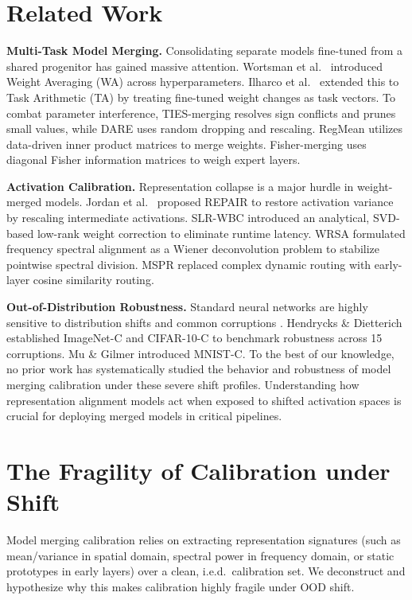 \documentclass{article}
\theoremstyle{plain}
\theoremstyle{definition}
\theoremstyle{remark}
\begin{document}
\section{Related Work}
\label{sec:related}
\textbf{Multi-Task Model Merging.} Consolidating separate models fine-tuned from a shared progenitor has gained massive attention. Wortsman et al.\ \cite{wortsman2022model} introduced Weight Averaging (WA) across hyperparameters. Ilharco et al.\ \cite{ilharco2022editing} extended this to Task Arithmetic (TA) by treating fine-tuned weight changes as task vectors. To combat parameter interference, TIES-merging \cite{ilharco2023ties} resolves sign conflicts and prunes small values, while DARE \cite{yu2023dare} uses random dropping and rescaling. RegMean \cite{matena2021merging} utilizes data-driven inner product matrices to merge weights. Fisher-merging uses diagonal Fisher information matrices to weigh expert layers.

\textbf{Activation Calibration.} Representation collapse is a major hurdle in weight-merged models. Jordan et al.\ \cite{jordan2023repair} proposed REPAIR to restore activation variance by rescaling intermediate activations. SLR-WBC \cite{anonymous2026slrwbc} introduced an analytical, SVD-based low-rank weight correction to eliminate runtime latency. WRSA \cite{anonymous2026wrsa} formulated frequency spectral alignment as a Wiener deconvolution problem to stabilize pointwise spectral division. MSPR \cite{anonymous2026mspr} replaced complex dynamic routing with early-layer cosine similarity routing.

\textbf{Out-of-Distribution Robustness.} Standard neural networks are highly sensitive to distribution shifts and common corruptions \cite{szegedy2013intriguing, goodfellow2014explaining}. Hendrycks \& Dietterich \cite{hendrycks2019benchmarking} established ImageNet-C and CIFAR-10-C to benchmark robustness across 15 corruptions. Mu \& Gilmer \cite{mu2019mnistc} introduced MNIST-C. To the best of our knowledge, no prior work has systematically studied the behavior and robustness of model merging calibration under these severe shift profiles. Understanding how representation alignment models act when exposed to shifted activation spaces is crucial for deploying merged models in critical pipelines.

\section{The Fragility of Calibration under Shift}
\label{sec:method}
Model merging calibration relies on extracting representation signatures (such as mean/variance in spatial domain, spectral power in frequency domain, or static prototypes in early layers) over a clean, i.e.d.\ calibration set. We deconstruct and hypothesize why this makes calibration highly fragile under OOD shift.
\end{document}
